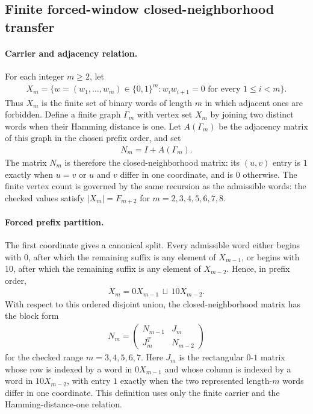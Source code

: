 
\subsection{Finite forced-window closed-neighborhood transfer}
\label{sec:window-fibonacci-cube-closed-neighborhood-transfer}

\paragraph{Carrier and adjacency relation.}
For each integer $m \geq 2$, let
$$
\begin{aligned}
X_m=\{w=(w_1,\ldots,w_m)\in \{0,1\}^m : w_iw_{i+1}=0\text{ for every }1\leq i<m\}.
\end{aligned}
$$
Thus $X_m$ is the finite set of binary words of length $m$ in which adjacent ones are forbidden. Define a finite graph $\Gamma_m$ with vertex set $X_m$ by joining two distinct words when their Hamming distance is one. Let $A(\Gamma_m)$ be the adjacency matrix of this graph in the chosen prefix order, and set
$$
\begin{aligned}
N_m=I+A(\Gamma_m).
\end{aligned}
$$
The matrix $N_m$ is therefore the closed-neighborhood matrix: its $(u,v)$ entry is $1$ exactly when $u=v$ or $u$ and $v$ differ in one coordinate, and is $0$ otherwise. The finite vertex count is governed by the same recursion as the admissible words: the checked values satisfy $|X_m|=F_{m+2}$ for $m=2,3,4,5,6,7,8$.

\paragraph{Forced prefix partition.}
The first coordinate gives a canonical split. Every admissible word either begins with $0$, after which the remaining suffix is any element of $X_{m-1}$, or begins with $10$, after which the remaining suffix is any element of $X_{m-2}$. Hence, in prefix order,
$$
\begin{aligned}
X_m=0X_{m-1}\,\sqcup\,10X_{m-2}.
\end{aligned}
$$
With respect to this ordered disjoint union, the closed-neighborhood matrix has the block form
$$
\begin{aligned}
N_m=\begin{pmatrix}N_{m-1}&J_m\\ J_m^T&N_{m-2}\end{pmatrix}
\end{aligned}
$$
for the checked range $m=3,4,5,6,7$. Here $J_m$ is the rectangular $0$-$1$ matrix whose row is indexed by a word in $0X_{m-1}$ and whose column is indexed by a word in $10X_{m-2}$, with entry $1$ exactly when the two represented length-$m$ words differ in one coordinate. This definition uses only the finite carrier and the Hamming-distance-one relation.

